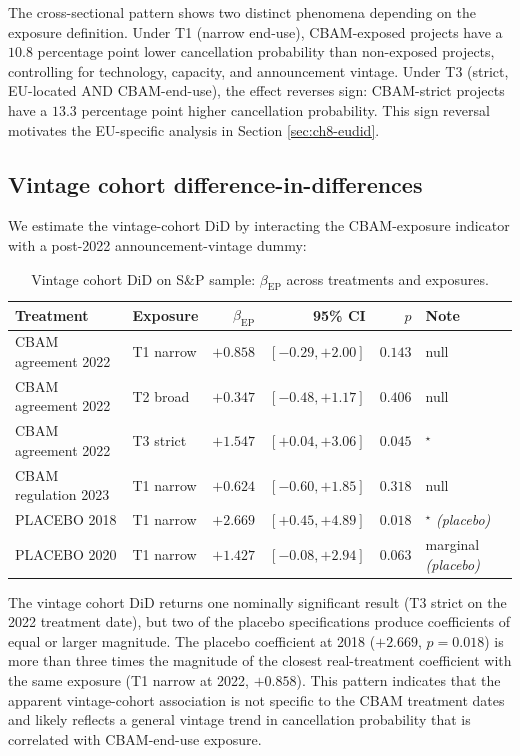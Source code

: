 \documentclass[11pt,a4paper]{article}
\newcommand{\bep}{\beta_{\mathrm{EP}}}
\begin{document}
The cross-sectional pattern shows two distinct phenomena depending on the exposure definition. Under T1 (narrow end-use), CBAM-exposed projects have a $10.8$ percentage point lower cancellation probability than non-exposed projects, controlling for technology, capacity, and announcement vintage. Under T3 (strict, EU-located AND CBAM-end-use), the effect reverses sign: CBAM-strict projects have a $13.3$ percentage point higher cancellation probability. This sign reversal motivates the EU-specific analysis in Section \ref{sec:ch8-eudid}.

\subsection{Vintage cohort difference-in-differences}

We estimate the vintage-cohort DiD by interacting the CBAM-exposure indicator with a post-2022 announcement-vintage dummy:

\begin{table}[ht]
\centering
\caption{Vintage cohort DiD on S\&P sample: $\beta_{\mathrm{EP}}$ across treatments and exposures.}
\label{tab:ch8-vintage-did}
\small
\begin{tabular}{llrrrl}
\toprule
Treatment & Exposure & $\bep$ & 95\% CI & $p$ & Note \\
\midrule
CBAM agreement 2022 & T1 narrow & $+0.858$ & $[-0.29, +2.00]$ & $0.143$ & null \\
CBAM agreement 2022 & T2 broad  & $+0.347$ & $[-0.48, +1.17]$ & $0.406$ & null \\
CBAM agreement 2022 & T3 strict & $+1.547$ & $[+0.04, +3.06]$ & $0.045$ & $^{\star}$ \\
CBAM regulation 2023 & T1 narrow & $+0.624$ & $[-0.60, +1.85]$ & $0.318$ & null \\
\rowcolor{gray!10}
PLACEBO 2018 & T1 narrow & $+2.669$ & $[+0.45, +4.89]$ & $0.018$ & $^{\star}$ \emph{(placebo)} \\
\rowcolor{gray!10}
PLACEBO 2020 & T1 narrow & $+1.427$ & $[-0.08, +2.94]$ & $0.063$ & marginal \emph{(placebo)} \\
\bottomrule
\end{tabular}
\end{table}

The vintage cohort DiD returns one nominally significant result (T3 strict on the 2022 treatment date), but two of the placebo specifications produce coefficients of equal or larger magnitude. The placebo coefficient at 2018 ($+2.669$, $p = 0.018$) is more than three times the magnitude of the closest real-treatment coefficient with the same exposure (T1 narrow at 2022, $+0.858$). This pattern indicates that the apparent vintage-cohort association is not specific to the CBAM treatment dates and likely reflects a general vintage trend in cancellation probability that is correlated with CBAM-end-use exposure.
\end{document}
